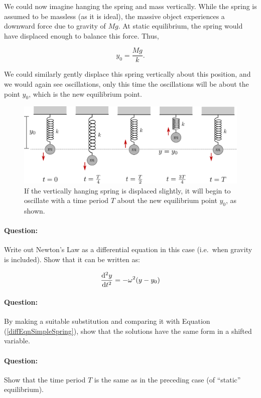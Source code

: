 We could now imagine hanging the spring and mass vertically. While the spring is assumed to be massless (as it is ideal), the massive object experiences a downward force due to gravity of $Mg$. At static equilibrium, the spring would have displaced enough to balance this force. Thus,

\begin{equation}
    y_0 = \frac{Mg}{k}.
    \label{masslessExt}
\end{equation}

We could similarly gently displace this spring vertically about this position, and we would again see oscillations, only this time the oscillations will be about the point $y_0$, which is the new equilibrium point.

\begin{figure}[!htb]
    \centering
    \includegraphics[width=\textwidth]{figs/springOscillations.png}
    \caption{If the vertically hanging spring is displaced slightly, it will begin to oscillate with a time period $T$ about the new equilibrium point $y_0$, as shown.}
    \label{fig:springOscillations}
\end{figure}


\begin{question}
\paragraph{Question:} Write out Newton's Law as a differential equation in this case (i.e.\ when gravity is included). Show that it can be written as:

\begin{equation*}
    \dv[2]{y}{t} = -\omega^2 (y - y_0) 
\end{equation*}

\paragraph{Question:} By making a suitable substitution and comparing it with Equation (\ref{diffEqnSimpleSpring}), show that the solutions have the same form in a shifted variable.

\paragraph{Question:} Show that the time period $T$ is the same as in the preceding case (of ``static'' equilibrium).
\end{question}


